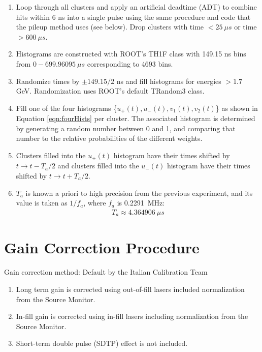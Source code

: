 	\begin{enumerate}
		\item{Loop through all clusters and apply an artificial deadtime (ADT) to combine hits within 6 ns into a single pulse using the same procedure and code that the pileup method uses (see below). Drop clusters with time $< \SI{25}{\mu s}$ or time $> \SI{600}{\mu s}$.}
		\item{Histograms are constructed with ROOT's TH1F class with 149.15 ns bins from $0 - \SI{699.96095}{\mu s}$ corresponding to 4693 bins.}
		\item{Randomize times by $\pm 149.15/2$ ns and fill histograms for energies $> 1.7$ GeV. Randomization uses ROOT's default TRandom3 class.}
		\item{Fill one of the four histograms \{$u_{+}(t), u_{-}(t), v_{1}(t), v_{2}(t)$\} as shown in Equation \ref{eqn:fourHists} per cluster. The associated histogram is determined by generating a random number between 0 and 1, and comparing that number to the relative probabilities of the different weights.}
		\item{Clusters filled into the $u_{+}(t)$ histogram have their times shifted by $t \rightarrow t - T_{a}/2$ and clusters filled into the $u_{-}(t)$ histogram have their times shifted by $t \rightarrow t + T_{a}/2$.}
		\item{$T_{a}$ is known a priori to high precision from the previous experiment, and its value is taken as $1/f_{a}$, where $f_{a}$ is \SI{0.2291}{MHz}:
			\begin{align}
				T_{a} \approx \SI{4.364906}{\mu s}
			\label{eq:Ta}
			\end{align}}
	\end{enumerate}


\section{Gain Correction Procedure}

	Gain correction method: Default by the Italian Calibration Team

	\begin{enumerate}
		\item{Long term gain is corrected using out-of-fill lasers included normalization from the Source Monitor.}
		\item{In-fill gain is corrected using in-fill lasers including normalization from the Source Monitor.}
		\item{Short-term double pulse (SDTP) effect is not included.}
	\end{enumerate}


